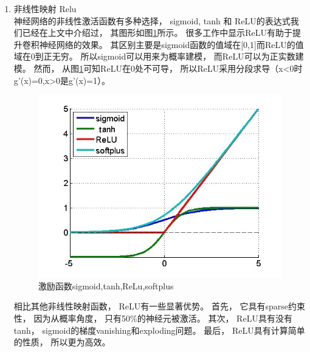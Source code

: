\begin{enumerate}
	

	\item 非线性映射 Relu\\
	神经网络的非线性激活函数有多种选择， sigmoid, tanh 和 ReLU的表达式我们已经在上文中介绍过， 其图形如图\ref{Fig:activation}所示。 很多工作中显示ReLU有助于提升卷积神经网络的效果\cite{glorot2011deep,maas2013rectifier}。 其区别主要是sigmoid函数的值域在[0,1]而ReLU的值域在0到正无穷。 所以sigmoid可以用来为概率建模， 而ReLU可以为正实数建模。 然而， 从图\ref{Fig:activation}可知ReLU在0处不可导， 所以ReLU采用分段求导（x<0时g'(x)=0,x>0是g'(x)=1）。
	
	\begin{figure}[htb]
  	\centering
  	\includegraphics[scale=0.8]{Pictures/CNN/activation.jpg}
  	\caption{激励函数sigmoid,tanh,ReLu,softplus}\label{Fig:activation}
	\end{figure}
	
	相比其他非线性映射函数， ReLU有一些显著优势。 首先， 它具有sparse约束性， 因为从概率角度， 只有50\%的神经元被激活。 其次， ReLU具有没有tanh， sigmoid的梯度vanishing和exploding问题\cite{zeiler2013rectified}。 最后， ReLU具有计算简单的性质， 所以更为高效。
	
\end{enumerate}



